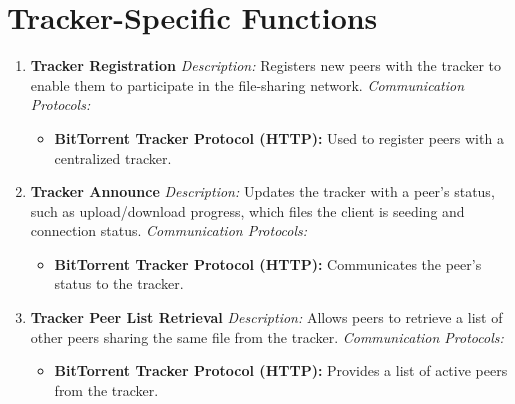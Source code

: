 \documentclass[a4paper]{article}
\begin{document}
\section{Tracker-Specific Functions}

\begin{enumerate}[label=\textbf{\arabic*.}, leftmargin=30pt, itemsep=10pt]

    \item \textbf{Tracker Registration}  
    \textit{Description:} Registers new peers with the tracker to enable them to participate in the file-sharing network.  
    \textit{Communication Protocols:}
    \begin{itemize}
        \item \textbf{BitTorrent Tracker Protocol (HTTP):} Used to register peers with a centralized tracker.
    \end{itemize}

    \item \textbf{Tracker Announce}  
    \textit{Description:} Updates the tracker with a peer’s status, such as upload/download progress, which files the client is seeding and connection status.  
    \textit{Communication Protocols:}
    \begin{itemize}
        \item \textbf{BitTorrent Tracker Protocol (HTTP):} Communicates the peer’s status to the tracker.
    \end{itemize}

    \item \textbf{Tracker Peer List Retrieval}  
    \textit{Description:} Allows peers to retrieve a list of other peers sharing the same file from the tracker.  
    \textit{Communication Protocols:}
    \begin{itemize}
        \item \textbf{BitTorrent Tracker Protocol (HTTP):} Provides a list of active peers from the tracker.
    \end{itemize}

\end{enumerate}
\end{document}
